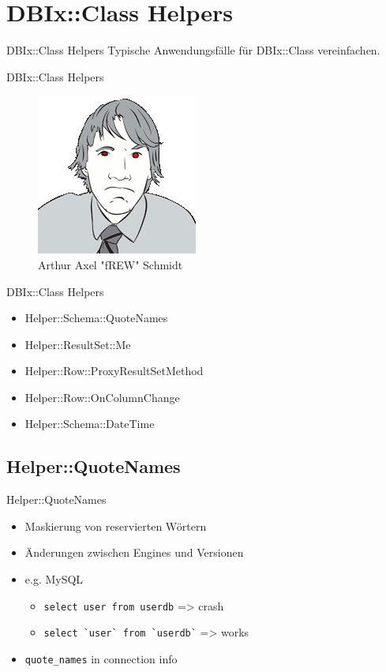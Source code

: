 \section{DBIx::Class Helpers}

\begin{frame}{DBIx::Class Helpers}
Typische Anwendungsfälle für DBIx::Class vereinfachen.
\end{frame}

\begin{frame}{DBIx::Class Helpers}
\begin{figure}[!ht]
\centering
\includegraphics[width=0.4\linewidth]{img/frew.png}
\caption{Arthur Axel "fREW" Schmidt}
\end{figure}
\end{frame}


\begin{frame}{DBIx::Class Helpers}
\begin{itemize}
\item Helper::Schema::QuoteNames
\item Helper::ResultSet::Me
\item Helper::Row::ProxyResultSetMethod
\item Helper::Row::OnColumnChange
\item Helper::Schema::DateTime
\end{itemize}
\end{frame}

\subsection{Helper::QuoteNames}

\begin{frame}[fragile]{Helper::QuoteNames}
\begin{itemize}
\item Maskierung von reservierten Wörtern
\item Änderungen zwischen Engines und Versionen
\item e.g. MySQL
\begin{itemize}
\item \verb|select user from userdb| => crash
\item \verb|select `user` from `userdb`| => works
\end{itemize}
\item \verb|quote_names| in connection info
\end{itemize}
\end{frame}

